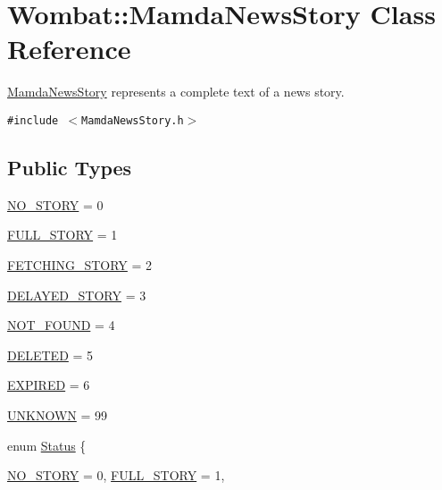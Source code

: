 \hypertarget{classWombat_1_1MamdaNewsStory}{
\section{Wombat::Mamda\-News\-Story Class Reference}
\label{classWombat_1_1MamdaNewsStory}
}
\hyperlink{classWombat_1_1MamdaNewsStory}{Mamda\-News\-Story} represents a complete text of a news story.  


{\tt \#include $<$Mamda\-News\-Story.h$>$}

\subsection*{Public Types}
\begin{CompactItemize}
\item 
\hyperlink{classWombat_1_1MamdaNewsStory_25ee81ce6b01be03a95ab954acdb1e6d3dc26b64a38eb820c4e81106826ed0f5}{NO\_\-STORY} = 0
\item 
\hyperlink{classWombat_1_1MamdaNewsStory_25ee81ce6b01be03a95ab954acdb1e6df59713209f835d23a4a0190ed3b7872a}{FULL\_\-STORY} = 1
\item 
\hyperlink{classWombat_1_1MamdaNewsStory_25ee81ce6b01be03a95ab954acdb1e6d866afc6753bbe803ee90064f27b16029}{FETCHING\_\-STORY} = 2
\item 
\hyperlink{classWombat_1_1MamdaNewsStory_25ee81ce6b01be03a95ab954acdb1e6dc9b90512cf65ec3da1f1c94d1c8cc916}{DELAYED\_\-STORY} = 3
\item 
\hyperlink{classWombat_1_1MamdaNewsStory_25ee81ce6b01be03a95ab954acdb1e6da7c45aed8f450f8f214fa6a21bd2bdad}{NOT\_\-FOUND} = 4
\item 
\hyperlink{classWombat_1_1MamdaNewsStory_25ee81ce6b01be03a95ab954acdb1e6d9a01a0950bd67668292e7fa1ec44e3f5}{DELETED} = 5
\item 
\hyperlink{classWombat_1_1MamdaNewsStory_25ee81ce6b01be03a95ab954acdb1e6d59c70f42395b766ed6e1a0bd7d8ffebb}{EXPIRED} = 6
\item 
\hyperlink{classWombat_1_1MamdaNewsStory_25ee81ce6b01be03a95ab954acdb1e6d43dd597758083814fe1acd2e024898d8}{UNKNOWN} = 99
\item 
enum \hyperlink{classWombat_1_1MamdaNewsStory_25ee81ce6b01be03a95ab954acdb1e6d}{Status} \{ \par
\hyperlink{classWombat_1_1MamdaNewsStory_25ee81ce6b01be03a95ab954acdb1e6d3dc26b64a38eb820c4e81106826ed0f5}{NO\_\-STORY} =  0, 
\hyperlink{classWombat_1_1MamdaNewsStory_25ee81ce6b01be03a95ab954acdb1e6df59713209f835d23a4a0190ed3b7872a}{FULL\_\-STORY} =  1, 

\end{CompactItemize}
